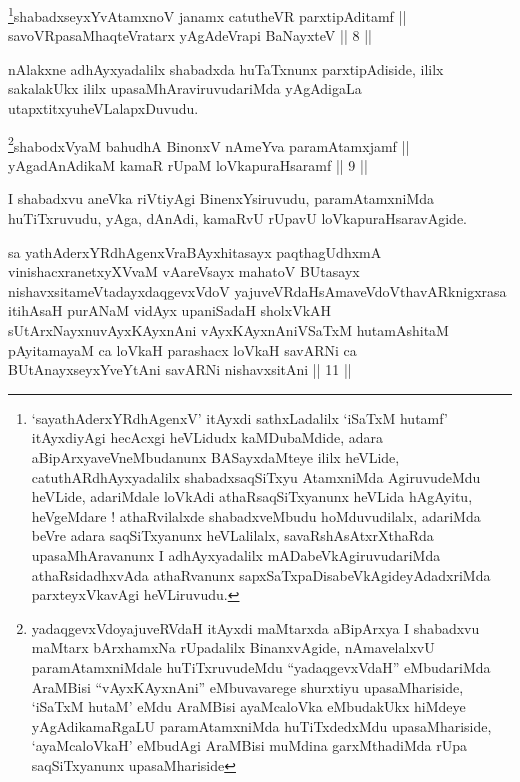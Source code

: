 \begin{shl}
\footnote{`sayathA\s \s derxYRdhAgenxV' itAyxdi sathxLadalilx `iSaTxM hutamf' itAyxdiyAgi hecAcxgi heVLidudx kaMDubaMdide, adara aBipArxyaveVneMbudanunx BASayxdaMteye ililx heVLide, catuthARdhAyxyadalilx shabadxsaqSiTxyu AtamxniMda AgiruvudeMdu heVLide, adariMdale loVkAdi athaRsaqSiTxyanunx heVLida hAgAyitu, heVgeMdare ! athaRvilalxde shabadxveMbudu hoMduvudilalx, adariMda beVre adara saqSiTxyanunx heVLalilalx, savaRshAsAtxrXthaRda upasaMhAravanunx I adhAyxyadalilx mADabeVkAgiruvudariMda athaRsidadhxvAda athaRvanunx sapxSaTxpaDisabeVkAgideyAdadxriMda parxteyxVkavAgi heVLiruvudu.}shabadxseyxYvA\s \s tamxnoV janamx catutheVR parxtipAditamf || \\
savoVRpasaMhaqteVratarx yAgAdeVrapi BaNayxteV \hfill || 8 ||
\end{shl}
				
\begin{artha}
nAlakxne adhAyxyadalilx shabadxda huTaTxnunx parxtipAdiside, ililx sakalakUkx ililx upasaMhAraviruvudariMda yAgAdigaLa utapxtitxyu\break heVLalapxDuvudu.
\end{artha}

\begin{shl}
\footnote{yadaqgevxVdoyajuveRVdaH itAyxdi maMtarxda aBipArxya \mdash   I shabadxvu maMtarx bArxhamxNa rUpadalilx BinanxvAgide, nAmavelalxvU paramAtamxniMdale huTiTxruvudeMdu ``yadaqgevxVdaH'' eMbudariMda AraMBisi ``vAyxKAyxnAni'' eMbuvavarege shurxtiyu upasaMhariside, `iSaTxM hutaM' eMdu AraMBisi ayaMcaloVka eMbudakUkx hiMdeye yAgAdikamaRgaLU paramAtamxniMda huTiTxdedxMdu upasaMhariside, `ayaMcaloVkaH' eMbudAgi AraMBisi muMdina garxMthadiMda rUpa saqSiTxyanunx upasaMhariside}shabodxV\s yaM bahudhA BinonxV nAmeYva paramAtamxjamf || \\
yAgadAnAdikaM kamaR rUpaM loVkapuraHsaramf \hfill || 9 ||  
\end{shl}

\begin{artha}
I shabadxvu aneVka riVtiyAgi BinenxYsiruvudu, paramAtamxniMda huTiTxruvudu, yAga, dAnAdi, kamaRvU rUpavU loVkapuraHsaravAgide.
\end{artha}


\begin{kandikeshl}
sa yathAderxYRdhAgenxVraBAyxhitasayx paqthagUdhxmA vinishacxranetxyXVvaM vA\break areV\s sayx mahatoV BUtasayx nishavxsitameVtadayxdaqgevxVdoV yajuveVRdaH\break sAmaveVdoV\s thavARknigxrasa itihAsaH purANaM vidAyx upaniSadaH sholxVkAH sUtArxNayxnuvAyxKAyxnAni vAyxKAyxnAniVSaTxM hutamAshitaM pAyitamayaM ca loVkaH parashacx loVkaH savARNi ca BUtAnayxseyxYveYtAni savARNi nishavxsitAni || 11 ||
\end{kandikeshl}

